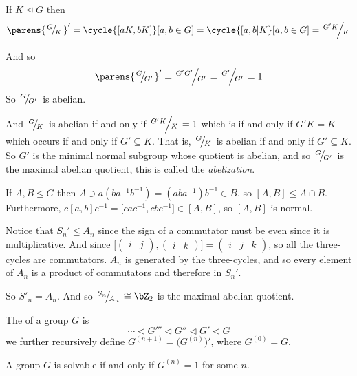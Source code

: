 \documentclass[10pt]{article}
\def\slfrac#1#2{\left.{}^{#1}\mkern-4mu\middle/\mkern-3mu{}_{#2}\right.}
\def\pmat#1{\begin{pmatrix} #1 \end{pmatrix}}
\let\normalsub=\trianglelefteq
\def\normal{\mathrel\triangleleft}
\begin{document}
    \item If $K\normalsub G$ then
    \[ \parens{\slfrac GK}' = \cycle{[aK,bK]}[a,b\in G] = \cycle{[a,b]K}[a,b\in G] = \slfrac{G'K}K \]

    \item And so
    \[ \parens{\slfrac G{G'}}' = \slfrac{G'G'}{G'} = \slfrac{G'}{G'} = 1 \]
    So $\slfrac G{G'}$ is abelian.

    \item And $\slfrac GK$ is abelian if and only if $\slfrac{G'K}{K}=1$ which is if and only if $G'K=K$ which occurs if and only if $G'\subseteq K$.
    That is, $\slfrac GK$ is abelian if and only if $G'\subseteq K$.
    So $G'$ is the minimal normal subgroup whose quotient is abelian, and so $\slfrac{G}{G'}$ is the maximal abelian quotient, this is called the \emph{abelization}.

    \item If $A,B\normalsub G$ then $A\ni a(ba^{-1}b^{-1})=(aba^{-1})b^{-1}\in B$, so $[A,B]\leq A\cap B$.
    Furthermore, $c[a,b]c^{-1}=\bigl[cac^{-1},cbc^{-1}\bigr]\in[A,B]$, so $[A,B]$ is normal.
\eenum

\begin{exam}

    Notice that $S_n'\leq A_n$ since the sign of a commutator must be even since it is multiplicative.
    And since $\bigl[\pmat{i & j}, \pmat{i & k}\bigr] = \pmat{i & j & k}$, so all the three-cycles are commutators.
    $A_n$ is generated by the three-cycles, and so every element of $A_n$ is a product of commutators and therefore in $S_n'$.

    So $S'_n=A_n$.
    And so $\slfrac{S_n}{A_n}\cong\bZ_2$ is the maximal abelian quotient.

\end{exam}

\begin{defn*}

    The  of a group $G$ is
    \[ \cdots \normal G''' \normal G'' \normal G' \normal G \]
    we further recursively define $G^{(n+1)}=\bigl(G^{(n)}\bigr)'$, where $G^{(0)}=G$.

\end{defn*}

\begin{thrm*}

    A group $G$ is solvable if and only if $G^{(n)}=1$ for some $n$.

\end{thrm*}
\end{document}
